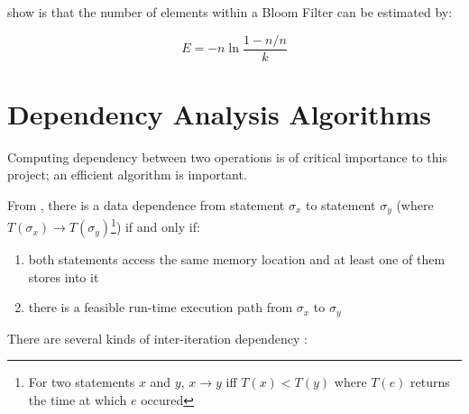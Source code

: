 		\citet{Swamidass2007} show is that the number of elements within a Bloom Filter can be estimated by:
		
		\[
		E = -n \ln \frac{1-n/n}{k}
		\]

\section{Dependency Analysis Algorithms} \label{sec:runtime/analysis}
	Computing dependency between two operations is of critical importance to this project; an efficient algorithm is important.
	
	From \citet[p.~37]{Allen2000}, there is a data dependence from statement $\sigma_x$ to statement $\sigma_y$ (where $T(\sigma_x) \rightarrow T(\sigma_y)$\footnote{For two statements $x$ and $y$, $x \rightarrow y$ iff $T(x) < T(y)$ where $T(e)$ returns the time at which $e$ occured}) if and only if:
	
	\begin{enumerate}
		\item both statements access the same memory location and at least one of them stores into it
		\item there is a feasible run-time execution path from $\sigma_x$ to $\sigma_y$
	\end{enumerate}
	
	There are several kinds of inter-iteration dependency \citep[p.~526]{Ibbett2009,ArchitectureBook}:
	
